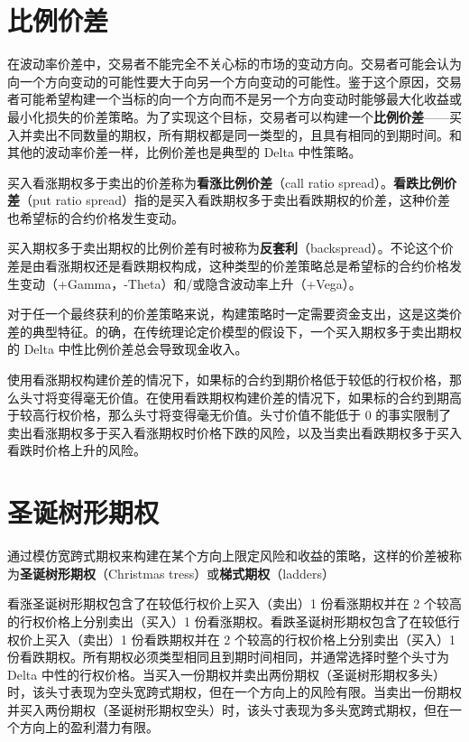 \section{比例价差}
在波动率价差中，交易者不能完全不关心标的市场的变动方向。交易者可能会认为向一个方向变动的可能性要大于向另一个方向变动的可能性。鉴于这个原因，交易者可能希望构建一个当标的向一个方向而不是另一个方向变动时能够最大化收益或最小化损失的价差策略。为了实现这个目标，交易者可以构建一个\textbf{比例价差}——买入并卖出不同数量的期权，所有期权都是同一类型的，且具有相同的到期时间。和其他的波动率价差一样，比例价差也是典型的 Delta 中性策略。

买入看涨期权多于卖出的价差称为\textbf{看涨比例价差}（call ratio spread）。\textbf{看跌比例价差}（put ratio spread）指的是买入看跌期权多于卖出看跌期权的价差，这种价差也希望标的合约价格发生变动。

买入期权多于卖出期权的比例价差有时被称为\textbf{反套利}（backspread）。不论这个价差是由看涨期权还是看跌期权构成，这种类型的价差策略总是希望标的合约价格发生变动（+Gamma，-Theta）和/或隐含波动率上升（+Vega）。

对于任一个最终获利的价差策略来说，构建策略时一定需要资金支出，这是这类价差的典型特征。的确，在传统理论定价模型的假设下，一个买入期权多于卖出期权的 Delta 中性比例价差总会导致现金收入。


使用看涨期权构建价差的情况下，如果标的合约到期价格低于较低的行权价格，那么头寸将变得毫无价值。在使用看跌期权构建价差的情况下，如果标的合约到期高于较高行权价格，那么头寸将变得毫无价值。头寸价值不能低于 0 的事实限制了卖出看涨期权多于买入看涨期权时价格下跌的风险，以及当卖出看跌期权多于买入看跌时价格上升的风险。
\section{圣诞树形期权}
通过模仿宽跨式期权来构建在某个方向上限定风险和收益的策略，这样的价差被称为\textbf{圣诞树形期权}（Christmas tress）或\textbf{梯式期权}（ladders）

看涨圣诞树形期权包含了在较低行权价上买入（卖出）1 份看涨期权并在 2 个较高的行权价格上分别卖出（买入）1 份看涨期权。看跌圣诞树形期权包含了在较低行权价上买入（卖出）1 份看跌期权并在 2 个较高的行权价格上分别卖出（买入）1 份看跌期权。所有期权必须类型相同且到期时间相同，并通常选择时整个头寸为 Delta 中性的行权价格。当买入一份期权并卖出两份期权（圣诞树形期权多头）时，该头寸表现为空头宽跨式期权，但在一个方向上的风险有限。当卖出一份期权并买入两份期权（圣诞树形期权空头）时，该头寸表现为多头宽跨式期权，但在一个方向上的盈利潜力有限。

